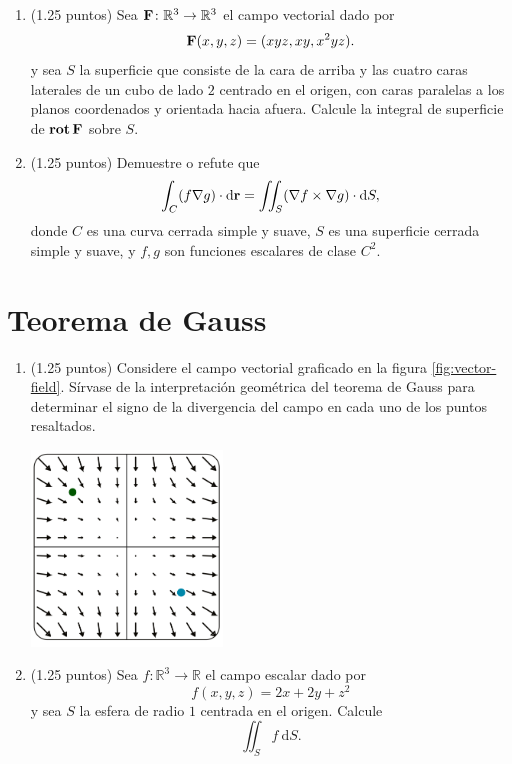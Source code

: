 \documentclass{fmbvecto}
\begin{document}
\begin{enumerate}

\item (1.25 puntos) Sea \(\boldsymbol{{\mathbf{F}}}\colon \mathbb{R}^3 \to \mathbb{R}^3\) el campo vectorial dado por
\[
  \boldsymbol{{\mathbf{F}}}(x, y, z) = (xyz, xy, x^2yz).
\]
y sea \(S\) la superficie que consiste de la cara de arriba y las cuatro caras laterales de un cubo de lado \(2\) centrado en el origen, con caras paralelas a los planos coordenados y orientada hacia afuera. Calcule la integral de superficie de \(\operatorname{\mathbf{rot}} \boldsymbol{{\mathbf{F}}}\) sobre \(S\).

\item (1.25 puntos) Demuestre o refute que 
\[
  \int_C (f \nabla g) \cdot \mathrm{d}\boldsymbol{{\mathbf{r}}} = \iint_S (\nabla f \times \nabla g) \cdot \mathrm{d}S,
\]
donde \(C\) es una curva cerrada simple y suave, \(S\) es una superficie cerrada simple y suave, y \(f, g\) son funciones escalares de clase \(C^2\).

\end{enumerate}

\section{Teorema de Gauss}

\begin{enumerate}

\item (1.25 puntos) Considere el campo vectorial graficado en la figura \ref{fig:vector-field}. Sírvase de la interpretación geométrica del teorema de Gauss para determinar el signo de la divergencia del campo en cada uno de los puntos resaltados.

\begin{center}
  \includegraphics[width=0.4\textwidth]{vector-field.png}
  \label{fig:vector-field}
\end{center}

\vspace*{1em}

\item (1.25 puntos) Sea \(f\colon \mathbb{R}^3 \to \mathbb{R}\) el campo escalar dado por
\[
  f(x, y, z) = 2x + 2y + z^2
\]
y sea \(S\) la esfera de radio \(1\) centrada en el origen. Calcule
\[
  \iint_S f \: \mathrm{d}S.
\]

\end{enumerate}
\end{document}
